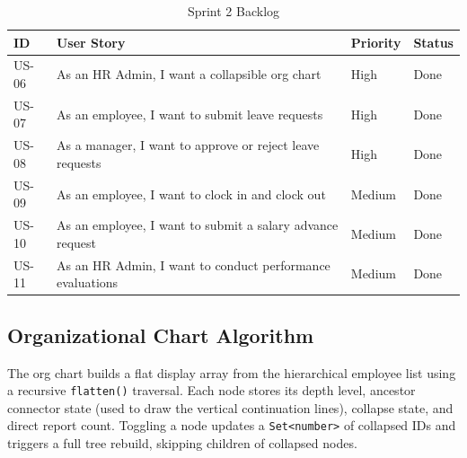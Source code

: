 \documentclass[12pt,a4paper]{report}
\newcommand{\cmark}{\ding{51}}
\begin{document}
\begin{table}[H]
\centering
\caption{Sprint 2 Backlog}
\label{tab:s2_backlog}
\begin{tabular}{|C{1.2cm}|L{7cm}|C{2cm}|C{2.5cm}|}
\hline
{}
\textbf{ID} & \textbf{User Story} & \textbf{Priority} & \textbf{Status} \\
\hline
US-06 & As an HR Admin, I want a collapsible org chart & High & \cmark Done \\
\hline
US-07 & As an employee, I want to submit leave requests & High & \cmark Done \\
\hline
US-08 & As a manager, I want to approve or reject leave requests & High & \cmark Done \\
\hline
US-09 & As an employee, I want to clock in and clock out & Medium & \cmark Done \\
\hline
US-10 & As an employee, I want to submit a salary advance request & Medium & \cmark Done \\
\hline
US-11 & As an HR Admin, I want to conduct performance evaluations & Medium & \cmark Done \\
\hline
\end{tabular}
\end{table}

\subsection{Organizational Chart Algorithm}

The org chart builds a flat display array from the hierarchical employee list using a
recursive \texttt{flatten()} traversal. Each node stores its depth level, ancestor
connector state (used to draw the vertical continuation lines), collapse state, and
direct report count. Toggling a node updates a \texttt{Set<number>} of collapsed IDs
and triggers a full tree rebuild, skipping children of collapsed nodes.
\end{document}
